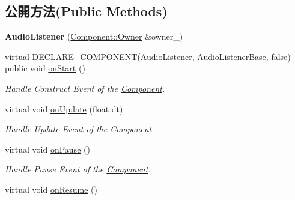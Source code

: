 \subsection*{公開方法(Public Methods)}
\begin{DoxyCompactItemize}
\item 
{\bfseries Audio\+Listener} (\hyperlink{class_magnum_1_1_component_1_1_owner}{Component\+::\+Owner} \&owner\+\_\+)\hypertarget{class_magnum_1_1_audio_listener_a04b65ebd93b410654adfa1c9123feabf}{}\label{class_magnum_1_1_audio_listener_a04b65ebd93b410654adfa1c9123feabf}

\item 
virtual D\+E\+C\+L\+A\+R\+E\+\_\+\+C\+O\+M\+P\+O\+N\+E\+NT(\hyperlink{class_magnum_1_1_audio_listener}{Audio\+Listener}, \hyperlink{class_magnum_1_1_audio_listener_base}{Audio\+Listener\+Base}, false) public void \hyperlink{class_magnum_1_1_audio_listener_a23529a3eee5c78384f27a23a591bbafc}{on\+Start} ()
\begin{DoxyCompactList}\small\item\em Handle Construct Event of the \hyperlink{class_magnum_1_1_component}{Component}. \end{DoxyCompactList}\item 
virtual void \hyperlink{class_magnum_1_1_audio_listener_a5c4315d477b68d95e62b487c8fbee1b2}{on\+Update} (float dt)
\begin{DoxyCompactList}\small\item\em Handle Update Event of the \hyperlink{class_magnum_1_1_component}{Component}. \end{DoxyCompactList}\item 
virtual void \hyperlink{class_magnum_1_1_audio_listener_a3a492ec19cbed653a14d70066a48d6a6}{on\+Pause} ()\hypertarget{class_magnum_1_1_audio_listener_a3a492ec19cbed653a14d70066a48d6a6}{}\label{class_magnum_1_1_audio_listener_a3a492ec19cbed653a14d70066a48d6a6}

\begin{DoxyCompactList}\small\item\em Handle Pause Event of the \hyperlink{class_magnum_1_1_component}{Component}. \end{DoxyCompactList}\item 
virtual void \hyperlink{class_magnum_1_1_audio_listener_a651e1468373094721df53a2ec35cc0bd}{on\+Resume} ()\hypertarget{class_magnum_1_1_audio_listener_a651e1468373094721df53a2ec35cc0bd}{}\label{class_magnum_1_1_audio_listener_a651e1468373094721df53a2ec35cc0bd}


\end{DoxyCompactItemize}
